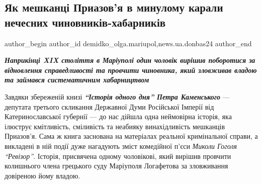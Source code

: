  
 
 
 
 
 
\subsection{Як мешканці Приазов'я в минулому карали нечесних чиновників-хабарників}
\label{sec:25_07_2022.stz.news.ua.donbas24.1.jak_meshkanci_priazovja_karaly_chynovnykiv_habarnykiv}
 
\ifcmt
 author_begin
   author_id demidko_olga.mariupol,news.ua.donbas24
 author_end
\fi


\begin{center}
  \em\color{blue}\bfseries\Large
Наприкінці XIX століття в Маріуполі один чоловік вирішив поборотися за
відновлення справедливості та провчити чиновника, який зловживав владою
та займався систематичним хабарництвом
\end{center}

Завдяки збереженій книзі \emph{\textbf{\enquote{Історія одного дня} Петра Каменського}} — депутата
третього скликання Державної Думи Російської Імперії від Катеринославської
губернії — до нас дійшла одна неймовірна історія, яка ілюструє кмітливість,
сміливість та неабияку винахідливість мешканців Приазов'я. Сама ж книга
заснована на матеріалах реальної кримінальної справи, а викладені в ній події
дуже нагадують зміст комедійної п'єси \emph{Миколи Гоголя \enquote{Ревізор}}. Історія,
присвячена одному чоловікові, який вирішив провчити колишнього члена грецького
суду Маріуполя Логафетова за зловживання довіреною йому владою.


